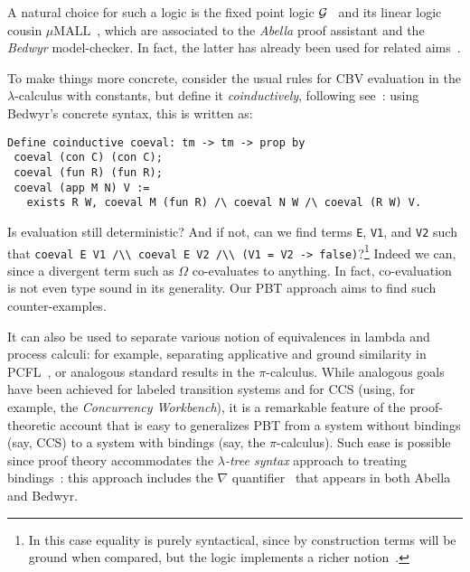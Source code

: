 \documentclass[a4paper]{easychair}
\begin{document}
A natural choice for such a logic is the fixed point logic $\cal
G$~\cite{Gacek2012} and its linear logic cousin $\mu\mathrm{MALL}$~\cite{Baelde12}, which are associated to the \emph{Abella} proof
assistant and the \emph{Bedwyr} model-checker.  In fact, the latter
has already been used for related aims~\cite{HeathM15}.


To make things more concrete, consider the usual rules for CBV
evaluation in the $\lambda$-calculus with constants, but define it
\emph{coinductively}, following see~\cite{2007-Leroy-Grall}: using Bedwyr's
concrete syntax, this is written as: 
\begin{lstlisting}
Define coinductive coeval: tm -> tm -> prop by
 coeval (con C) (con C);
 coeval (fun R) (fun R);
 coeval (app M N) V := 
   exists R W, coeval M (fun R) /\ coeval N W /\ coeval (R W) V.
\end{lstlisting}
Is evaluation still deterministic?  And if not, can we find terms
\lstinline{E}, \lstinline{V1}, and \lstinline{V2} such that
\mbox{\lstinline{coeval E V1 /\\ coeval E V2 /\\ (V1 = V2 -> false)}}?\footnote{In
  this case equality is purely syntactical, since by construction terms
  will be ground when compared, but the logic implements a richer
  notion~\cite{GacekMN11}.} Indeed we can, since a divergent term such
as $\Omega$ co-evaluates to anything.  In fact, co-evaluation is not
even type sound in its generality. Our PBT approach aims to find such
counter-examples.

It can also be used to separate various notion of
equivalences in lambda and process calculi: for example,
separating applicative and ground similarity in PCFL~\cite{PITobtpe},
or analogous standard results in the $\pi$-calculus.
%
While analogous goals have been achieved for labeled transition systems
and for CCS (using, for example, the \emph{Concurrency Workbench}), it
is a remarkable feature of the proof-theoretic account that is easy to
generalizes PBT from a system without bindings (say, CCS) to a system
with bindings (say, the $\pi$-calculus).
%
Such ease is possible since proof theory accommodates the
\emph{$\lambda$-tree syntax} approach to treating bindings~\cite{miller18jar}: this approach includes the $\nabla$
quantifier~\cite{miller05tocl} that appears in both Abella and Bedwyr.
\end{document}
